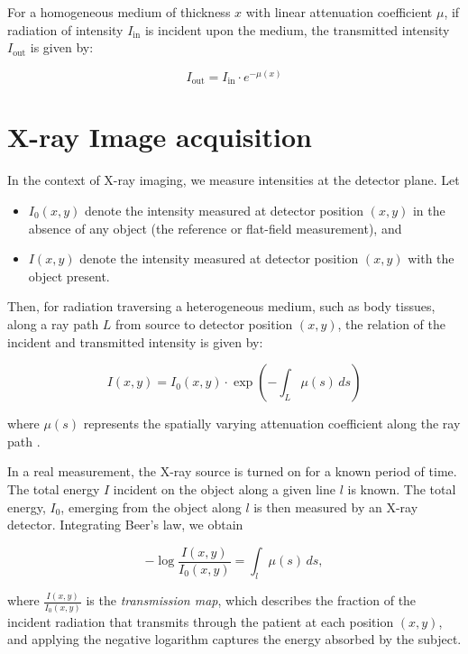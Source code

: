 \documentclass[nomenclature, english, bibtex]{kththesis}
\numberwithin{listing}{chapter}
\begin{document}
For a homogeneous medium of thickness $x$ with linear attenuation coefficient $\mu$, if radiation of intensity
$I_{\text{in}}$ is incident upon the medium, the transmitted intensity $I_{\text{out}}$ is given by:

\begin{equation}
I_{\text{out}} = I_{\text{in}} \cdot e^{-\mu(x)}
\label{eq:beer_lambert}
\end{equation}

\section{X-ray Image acquisition}

In the context of X-ray imaging, we measure intensities at the detector plane. Let

\begin{itemize}
\item $I_0(x,y)$ denote the intensity measured at detector position $(x,y)$ in the absence
    of any object (the reference or flat-field measurement), and
\item $I(x,y)$ denote the intensity measured at detector position $(x,y)$ with the object present.
\end{itemize}

Then, for radiation traversing a heterogeneous medium, such as body tissues, along a ray path $L$
from source to detector position $(x,y)$, the relation of the incident and transmitted intensity is
given by:

\begin{equation}
I(x,y) = I_0(x,y) \cdot \exp\left(-\int_L \mu(s) \, ds\right)
\label{eq:beer_lambert_imaging}
\end{equation}

where $\mu(s)$ represents the spatially varying attenuation coefficient along the ray path \cite[p.~57]{epstein2008}.

In a real measurement, the X-ray source is turned on for a known period of time. The total energy
$I$ incident on the object along a given line $l$ is known. The total energy, $I_0$, emerging from the object
along $l$ is then measured by an X-ray detector. Integrating Beer’s law, we obtain \cite[p.~60]{epstein2008}

\begin{equation}
    -\log \frac{I(x,y)}{I_0(x,y)} = \int_l \mu(s) \, ds,
\end{equation}

where $\frac{I(x, y)}{I_0(x, y)}$ is the \textit{transmission map}, which describes the fraction of the
incident radiation that transmits through the patient at each position $(x, y)$, and applying
the negative logarithm captures the energy absorbed by the subject.
\end{document}
